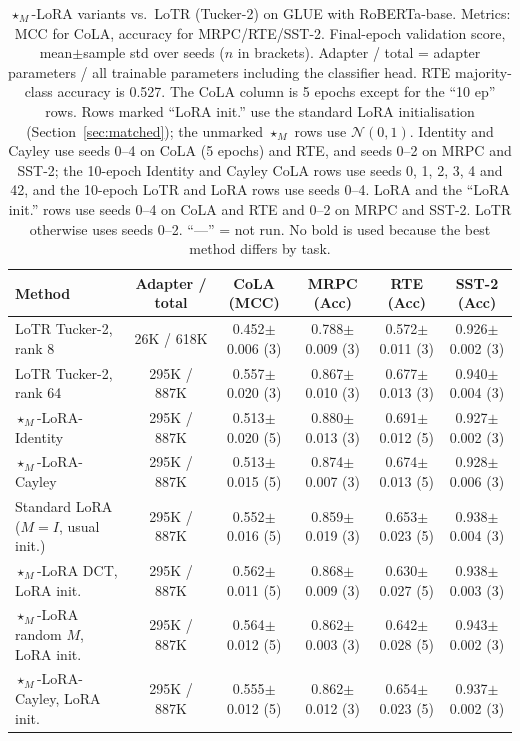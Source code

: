 \documentclass{article}
\theoremstyle{plain}
\begin{document}
\begin{table}[h]
\centering
\caption{$\star_M$-LoRA variants vs.\ LoTR (Tucker-2) on GLUE with RoBERTa-base.
Metrics: MCC for CoLA, accuracy for MRPC/RTE/SST-2. Final-epoch validation score,
mean$\pm$sample std over seeds ($n$ in brackets).
Adapter / total = adapter parameters / all trainable parameters including the classifier head.
RTE majority-class accuracy is 0.527.
The CoLA column is 5 epochs except for the ``10 ep'' rows.
Rows marked ``LoRA init.'' use the standard LoRA initialisation (Section~\ref{sec:matched}); the unmarked $\star_M$ rows use $\mathcal{N}(0,1)$.
Identity and Cayley use seeds 0--4 on CoLA (5 epochs) and RTE, and seeds 0--2 on MRPC and SST-2;
the 10-epoch Identity and Cayley CoLA rows use seeds 0, 1, 2, 3, 4 and 42, and the 10-epoch LoTR and LoRA rows use seeds 0--4.
LoRA and the ``LoRA init.'' rows use seeds 0--4 on CoLA and RTE and 0--2 on MRPC and SST-2. LoTR otherwise uses seeds 0--2.
``---'' = not run. No bold is used because the best method differs by task.}
\label{tab:glue}
\scriptsize
\setlength{\tabcolsep}{3pt}
\begin{tabular}{lccccc}
\toprule
Method & Adapter / total & CoLA (MCC) & MRPC (Acc) & RTE (Acc) & SST-2 (Acc) \\
\midrule
LoTR Tucker-2, rank 8
  & 26K / 618K
  & 0.452$\pm$0.006 (3) & 0.788$\pm$0.009 (3) & 0.572$\pm$0.011 (3) & 0.926$\pm$0.002 (3) \\
LoTR Tucker-2, rank 64
  & 295K / 887K
  & 0.557$\pm$0.020 (3) & 0.867$\pm$0.010 (3) & 0.677$\pm$0.013 (3) & 0.940$\pm$0.004 (3) \\
$\star_M$-LoRA-Identity
  & 295K / 887K
  & 0.513$\pm$0.020 (5) & 0.880$\pm$0.013 (3) & 0.691$\pm$0.012 (5) & 0.927$\pm$0.002 (3) \\
$\star_M$-LoRA-Cayley
  & 295K / 887K
  & 0.513$\pm$0.015 (5) & 0.874$\pm$0.007 (3) & 0.674$\pm$0.013 (5) & 0.928$\pm$0.006 (3) \\
Standard LoRA ($M=I$, usual init.)
  & 295K / 887K
  & 0.552$\pm$0.016 (5) & 0.859$\pm$0.019 (3) & 0.653$\pm$0.023 (5) & 0.938$\pm$0.004 (3) \\
$\star_M$-LoRA DCT, LoRA init.
  & 295K / 887K
  & 0.562$\pm$0.011 (5) & 0.868$\pm$0.009 (3) & 0.630$\pm$0.027 (5) & 0.938$\pm$0.003 (3) \\
$\star_M$-LoRA random $M$, LoRA init.
  & 295K / 887K
  & 0.564$\pm$0.012 (5) & 0.862$\pm$0.003 (3) & 0.642$\pm$0.028 (5) & 0.943$\pm$0.002 (3) \\
$\star_M$-LoRA-Cayley, LoRA init.
  & 295K / 887K
  & 0.555$\pm$0.012 (5) & 0.862$\pm$0.012 (3) & 0.654$\pm$0.023 (5) & 0.937$\pm$0.002 (3) \\

\end{tabular}
\end{table}
\end{document}
